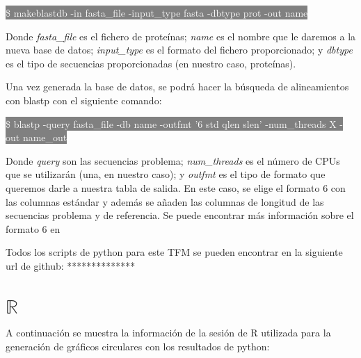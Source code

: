 \vspace{3mm}
\colorbox{gray}{\textcolor{white} {\$ makeblastdb -in fasta\_file -input\_type fasta -dbtype prot -out name}}
\vspace{3mm}

Donde \textit{fasta\_file} es el fichero de proteínas; \textit{name} es el nombre que le daremos a la nueva base de datos; \textit{input\_type} es el formato del fichero proporcionado; y \textit{dbtype} es el tipo de secuencias proporcionadas (en nuestro caso, proteínas).

Una vez generada la base de datos, se podrá hacer la búsqueda de alineamientos con blastp con el siguiente comando:

\vspace{3mm}
\colorbox{gray}{\textcolor{white} {\$ blastp -query fasta\_file -db name -outfmt '6 std qlen slen' -num\_threads X -out name\_out}}
\vspace{3mm}

Donde \textit{query} son las secuencias problema; \textit{num\_threads} es el número de CPUs que se utilizarán (una, en nuestro caso); y \textit{outfmt} es el tipo de formato que queremos darle a nuestra tabla de salida. En este caso, se elige el formato 6 con las columnas estándar y además se añaden las columnas de longitud de las secuencias problema y de referencia. Se puede encontrar más información sobre el formato 6 en \cite{scholz_blastn_nodate}

Todos los scripts de python para este TFM se pueden encontrar en la siguiente url de github: **************

\newpage
\section{$\mathbb{R}$}

A continuación se muestra la información de la sesión de R utilizada para la generación de gráficos circulares con los resultados de python:

